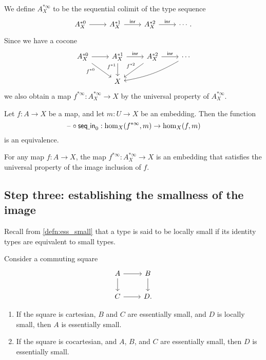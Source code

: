 \begin{defn}
We define $A_X^{\ast\infty}$ to be the sequential colimit of the type sequence
\begin{equation*}
\begin{tikzcd}
A_X^{\ast 0} \arrow[r] & A_X^{\ast 1} \arrow[r,"\inr"] & A_X^{\ast 2} \arrow[r,"\inr"] & \cdots.
\end{tikzcd}
\end{equation*}
Since we have a cocone
\begin{equation*}
\begin{tikzcd}
A_X^{\ast 0} \arrow[r] \arrow[dr,swap,"f^{\ast 0}" near start] & A_X^{\ast 1} \arrow[r,"\inr"] \arrow[d,swap,"f^{\ast 1}" near start] & A_X^{\ast 2} \arrow[r,"\inr"] \arrow[dl,swap,"f^{\ast 2}" xshift=1ex] & \cdots \arrow[dll,bend left=10] \\
& X
\end{tikzcd}
\end{equation*}
we also obtain a map $f^{\ast\infty}:A_X^{\ast\infty}\to X$ by the universal property of $A_X^{\ast\infty}$. 
\end{defn}

\begin{lem}\label{lem:finfjp_up}
Let $f:A\to X$ be a map, and let $m:U\to X$ be an embedding. Then the function
\begin{equation*}
\mathord{\hspace{1pt}\text{--}\hspace{1pt}}\circ \mathsf{seq\underline{\ }{}in}_0: \mathrm{hom}_X(f^{\ast\infty},m)\to \mathrm{hom}_X(f,m)
\end{equation*}
is an equivalence. 
\end{lem}

\begin{thm}\label{thm:image}
For any map $f:A\to X$, the map $f^{\ast\infty}:A_X^{\ast\infty}\to X$ is an embedding that satisfies the universal property of the image inclusion of $f$.
\end{thm}

\subsection{Step three: establishing the smallness of the image}

Recall from \cref{defn:ess_small} that a type is said to be locally small if its identity types are equivalent to small types.

\begin{lem}
Consider a commuting square
\begin{equation*}
\begin{tikzcd}
A \arrow[r] \arrow[d] & B \arrow[d] \\
C \arrow[r] & D.
\end{tikzcd}
\end{equation*}
\begin{enumerate}
\item If the square is cartesian, $B$ and $C$ are essentially small, and $D$ is locally small, then $A$ is essentially small.
\item If the square is cocartesian, and $A$, $B$, and $C$ are essentially small, then $D$ is essentially small. 
\end{enumerate}
\end{lem}

